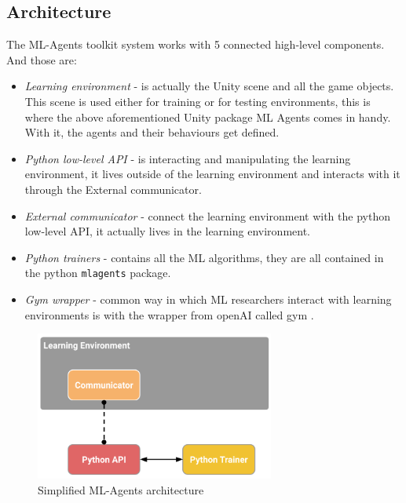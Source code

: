 \documentclass[a4paper, 12pt]{book}
\begin{document}
\subsection{Architecture}

The ML-Agents toolkit system works with 5 connected high-level components. And those are:

\begin{itemize}
    \item \emph{Learning environment} - is actually the Unity scene and all the game objects. This scene is used either for training or for testing environments, this is where the above aforementioned Unity package ML Agents comes in handy. With it, the agents and their behaviours get defined.
    \item \emph{Python low-level API} - is interacting and manipulating the learning environment, it lives outside of the learning environment and interacts with it through the External communicator.
    \item \emph{External communicator} - connect the learning environment with the python low-level API, it actually lives in the learning environment.
    \item \emph{Python trainers} - contains all the ML algorithms, they are all contained in the python \texttt{mlagents} package.
    \item \emph{Gym wrapper} - common way in which ML researchers interact with learning environments is with the wrapper from openAI called gym \cite{openAIGym}.
\end{itemize}

\begin{figure}[h]
\begin{center}
\includegraphics[width=0.7\textwidth]{Images/learning_environment_basic.png}
\end{center}
\caption{Simplified ML-Agents architecture \cite{MLAgents}}
\label{pic6}
\end{figure}
\end{document}
